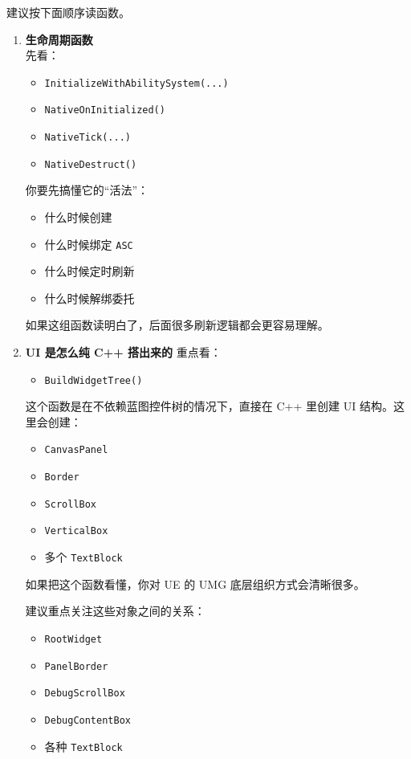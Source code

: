 建议按下面顺序读函数。
\begin{enumerate}
	
	\item \textbf{生命周期函数}\\
	先看：
	
	\begin{itemize}
		\item \texttt{InitializeWithAbilitySystem(...)}
		\item \texttt{NativeOnInitialized()}
		\item \texttt{NativeTick(...)}
		\item \texttt{NativeDestruct()}
	\end{itemize}
	
	你要先搞懂它的“活法”：
	
	\begin{itemize}
		\item 什么时候创建
		\item 什么时候绑定 \texttt{ASC}
		\item 什么时候定时刷新
		\item 什么时候解绑委托
	\end{itemize}
	
	如果这组函数读明白了，后面很多刷新逻辑都会更容易理解。
	
	\item \textbf{UI 是怎么纯 C++ 搭出来的}
	重点看：
	
	\begin{itemize}
		\item \texttt{BuildWidgetTree()}
	\end{itemize}
	
	这个函数是在不依赖蓝图控件树的情况下，直接在 C++ 里创建 UI 结构。这里会创建：
	
	\begin{itemize}
		\item \texttt{CanvasPanel}
		\item \texttt{Border}
		\item \texttt{ScrollBox}
		\item \texttt{VerticalBox}
		\item 多个 \texttt{TextBlock}
	\end{itemize}
	
	如果把这个函数看懂，你对 UE 的 UMG 底层组织方式会清晰很多。
	
	建议重点关注这些对象之间的关系：
	
	\begin{itemize}
		\item \texttt{RootWidget}
		\item \texttt{PanelBorder}
		\item \texttt{DebugScrollBox}
		\item \texttt{DebugContentBox}
		\item 各种 \texttt{TextBlock}
	\end{itemize}
	

\end{enumerate}

